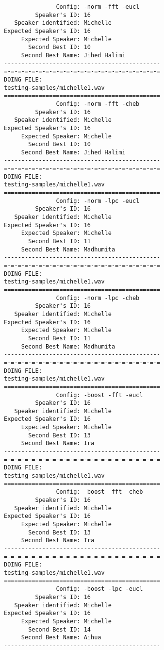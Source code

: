 \begin{verbatim}
               Config: -norm -fft -eucl
         Speaker's ID: 16
   Speaker identified: Michelle
Expected Speaker's ID: 16
     Expected Speaker: Michelle
       Second Best ID: 10
     Second Best Name: Jihed Halimi
---------------------------------------------
=-=-=-=-=-=-=-=-=-=-=-=-=-=-=-=-=-=-=-=-=-=-=
DOING FILE:
testing-samples/michelle1.wav
=============================================
               Config: -norm -fft -cheb
         Speaker's ID: 16
   Speaker identified: Michelle
Expected Speaker's ID: 16
     Expected Speaker: Michelle
       Second Best ID: 10
     Second Best Name: Jihed Halimi
---------------------------------------------
=-=-=-=-=-=-=-=-=-=-=-=-=-=-=-=-=-=-=-=-=-=-=
DOING FILE:
testing-samples/michelle1.wav
=============================================
               Config: -norm -lpc -eucl
         Speaker's ID: 16
   Speaker identified: Michelle
Expected Speaker's ID: 16
     Expected Speaker: Michelle
       Second Best ID: 11
     Second Best Name: Madhumita
---------------------------------------------
=-=-=-=-=-=-=-=-=-=-=-=-=-=-=-=-=-=-=-=-=-=-=
DOING FILE:
testing-samples/michelle1.wav
=============================================
               Config: -norm -lpc -cheb
         Speaker's ID: 16
   Speaker identified: Michelle
Expected Speaker's ID: 16
     Expected Speaker: Michelle
       Second Best ID: 11
     Second Best Name: Madhumita
---------------------------------------------
=-=-=-=-=-=-=-=-=-=-=-=-=-=-=-=-=-=-=-=-=-=-=
DOING FILE:
testing-samples/michelle1.wav
=============================================
               Config: -boost -fft -eucl
         Speaker's ID: 16
   Speaker identified: Michelle
Expected Speaker's ID: 16
     Expected Speaker: Michelle
       Second Best ID: 13
     Second Best Name: Ira
---------------------------------------------
=-=-=-=-=-=-=-=-=-=-=-=-=-=-=-=-=-=-=-=-=-=-=
DOING FILE:
testing-samples/michelle1.wav
=============================================
               Config: -boost -fft -cheb
         Speaker's ID: 16
   Speaker identified: Michelle
Expected Speaker's ID: 16
     Expected Speaker: Michelle
       Second Best ID: 13
     Second Best Name: Ira
---------------------------------------------
=-=-=-=-=-=-=-=-=-=-=-=-=-=-=-=-=-=-=-=-=-=-=
DOING FILE:
testing-samples/michelle1.wav
=============================================
               Config: -boost -lpc -eucl
         Speaker's ID: 16
   Speaker identified: Michelle
Expected Speaker's ID: 16
     Expected Speaker: Michelle
       Second Best ID: 14
     Second Best Name: Aihua
---------------------------------------------

\end{verbatim}
